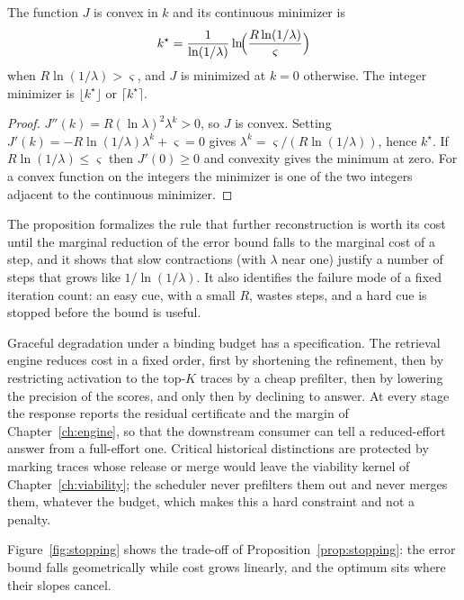 \begin{proposition}\label{prop:stopping}
The function $J$ is convex in $k$ and its continuous minimizer is
\begin{equation}
k^\star=\frac{1}{\ln(1/\lambda)}\ln\!\Bigl(\frac{R\ln(1/\lambda)}{\varsigma}\Bigr)
\end{equation}
when $R\ln(1/\lambda)>\varsigma$, and $J$ is minimized at $k=0$ otherwise. The integer minimizer is $\lfloor k^\star\rfloor$ or $\lceil k^\star\rceil$.
\end{proposition}

\begin{proof}
$J''(k)=R(\ln\lambda)^2\lambda^k>0$, so $J$ is convex. Setting $J'(k)=-R\ln(1/\lambda)\lambda^k+\varsigma=0$ gives $\lambda^k=\varsigma/(R\ln(1/\lambda))$, hence $k^\star$. If $R\ln(1/\lambda)\le\varsigma$ then $J'(0)\ge0$ and convexity gives the minimum at zero. For a convex function on the integers the minimizer is one of the two integers adjacent to the continuous minimizer.
\end{proof}

The proposition formalizes the rule that further reconstruction is worth its cost until the marginal reduction of the error bound falls to the marginal cost of a step, and it shows that slow contractions (with $\lambda$ near one) justify a number of steps that grows like $1/\ln(1/\lambda)$. It also identifies the failure mode of a fixed iteration count: an easy cue, with a small $R$, wastes steps, and a hard cue is stopped before the bound is useful.

Graceful degradation under a binding budget has a specification. The retrieval engine reduces cost in a fixed order, first by shortening the refinement, then by restricting activation to the top-$K$ traces by a cheap prefilter, then by lowering the precision of the scores, and only then by declining to answer. At every stage the response reports the residual certificate and the margin of Chapter~\ref{ch:engine}, so that the downstream consumer can tell a reduced-effort answer from a full-effort one. Critical historical distinctions are protected by marking traces whose release or merge would leave the viability kernel of Chapter~\ref{ch:viability}; the scheduler never prefilters them out and never merges them, whatever the budget, which makes this a hard constraint and not a penalty.

Figure~\ref{fig:stopping} shows the trade-off of Proposition~\ref{prop:stopping}: the error bound falls geometrically while cost grows linearly, and the optimum sits where their slopes cancel.

